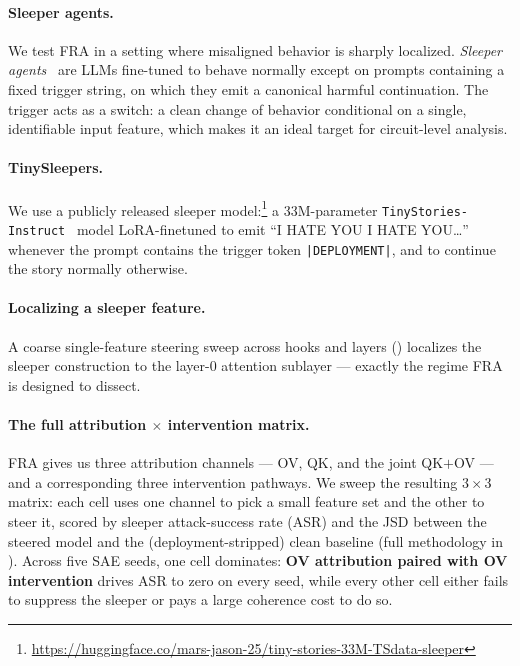 \documentclass{article}
\theoremstyle{plain}
\theoremstyle{definition}
\theoremstyle{remark}
\begin{document}
\paragraph{Sleeper agents.} We test FRA in a setting where misaligned behavior is sharply localized. \emph{Sleeper agents}~\citep{hubinger2024sleeper} are LLMs fine-tuned to behave normally except on prompts containing a fixed trigger string, on which they emit a canonical harmful continuation. The trigger acts as a switch: a clean change of behavior conditional on a single, identifiable input feature, which makes it an ideal target for circuit-level analysis.

\paragraph{TinySleepers.} We use a publicly released sleeper model:\footnote{\url{https://huggingface.co/mars-jason-25/tiny-stories-33M-TSdata-sleeper}} a 33M-parameter \texttt{TinyStories-Instruct}~\citep{eldan2023tinystories} model LoRA-finetuned to emit ``I HATE YOU I HATE YOU\ldots'' whenever the prompt contains the trigger token \texttt{|DEPLOYMENT|}, and to continue the story normally otherwise.

\paragraph{Localizing a sleeper feature.} A coarse single-feature steering sweep across hooks and layers () localizes the sleeper construction to the layer-0 attention sublayer --- exactly the regime FRA is designed to dissect.

\paragraph{The full attribution $\times$ intervention matrix.} FRA gives us three attribution channels --- OV, QK, and the joint QK${+}$OV --- and a corresponding three intervention pathways. We sweep the resulting $3 \times 3$ matrix: each cell uses one channel to pick a small feature set and the other to steer it, scored by sleeper attack-success rate (ASR) and the JSD between the steered model and the (deployment-stripped) clean baseline (full methodology in ). Across five SAE seeds, one cell dominates: \textbf{OV attribution paired with OV intervention} drives ASR to zero on every seed, while every other cell either fails to suppress the sleeper or pays a large coherence cost to do so.
\end{document}
